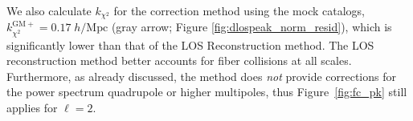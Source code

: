                                                                                                                                                                                                                                                                          We also calculate $k_{\chi^2}$ for the \cite{Gil-Marin:2014aa} 
                                                                                                                                                                                                                                                                         correction method using the mock catalogs, 
                                                                                                                                                                                                                                                                         $k_{\chi^2}^\mathrm{GM+} = 0.17 \;h/\mathrm{Mpc}$ (gray arrow; Figure \ref{fig:dlospeak_norm_resid}), 
                                                                                                                                                                                                                                                                         which is significantly lower than that of the LOS Reconstruction method. 
                                                                                                                                                                                                                                                                         The LOS reconstruction method better accounts for fiber collisions at all 
                                                                                                                                                                                                                                                                         scales. Furthermore, as already discussed, the \cite{Gil-Marin:2014aa} 
                                                                                                                                                                                                                                                                         method does {\em not} provide corrections for the power spectrum 
                                                                                                                                                                                                                                                                         quadrupole or higher multipoles, thus Figure~\ref{fig:fc_pk} still applies for $\ell=2$.

